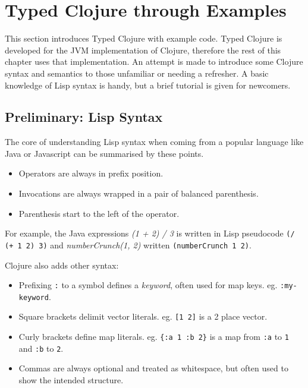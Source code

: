 \section{Typed Clojure through Examples}

This section introduces Typed Clojure with example code. 
Typed Clojure is developed for the JVM implementation of Clojure, therefore
the rest of this chapter uses that implementation.
An attempt is
made to introduce some Clojure syntax and semantics to those unfamiliar or needing a refresher.
A basic knowledge of Lisp syntax is handy, but a brief tutorial is given
for newcomers.

\subsection{Preliminary: Lisp Syntax}

The core of understanding Lisp syntax when coming from a popular language
like Java or Javascript can be summarised by these points.

\begin{itemize}
  \item Operators are always in prefix position.
  \item Invocations are always wrapped in a pair of balanced parenthesis.
  \item Parenthesis start to the left of the operator.
\end{itemize}

For example, the Java expressions \emph{(1 + 2) / 3} is written in Lisp pseudocode \lstinline|(/ (+ 1 2) 3)|
and \emph{numberCrunch(1, 2)} written \lstinline|(numberCrunch 1 2)|.

Clojure also adds other syntax:

\begin{itemize}
  \item Prefixing \lstinline|:| to a symbol defines a \emph{keyword}, often used for map keys. eg. \lstinline|:my-keyword|.
  \item Square brackets delimit vector literals. eg. \lstinline|[1 2]| is a 2 place vector.
  \item Curly brackets define map literals. eg. \lstinline|{:a 1 :b 2}| is a map from 
        \lstinline|:a| to \lstinline|1| and \lstinline|:b| to \lstinline|2|.
  \item Commas are always optional and treated as whitespace, but often used to show the intended structure.
\end{itemize}


